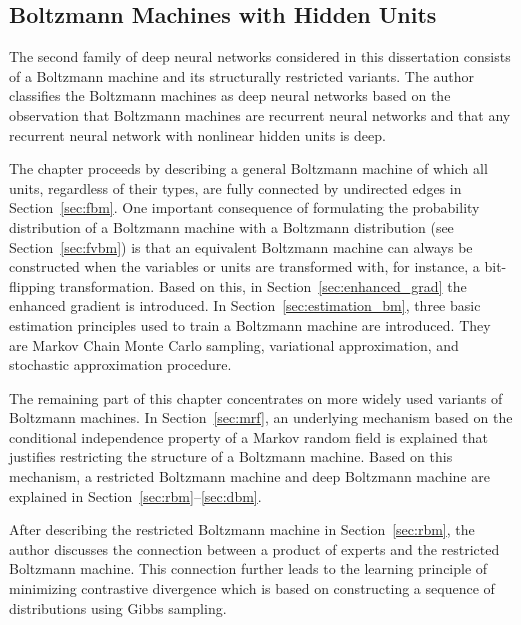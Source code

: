 \documentclass{now}
\newcommand{\alert}[1]{\textcolor{red}{#1}}
\newcommand{\citepub}[1]{\alert{#1}}
\begin{document}
\subsection{Boltzmann Machines with Hidden Units}

The second family of deep neural networks considered in this dissertation
consists of a Boltzmann machine and its structurally restricted variants. The
author classifies the Boltzmann machines as deep neural networks based on the
observation that Boltzmann machines are recurrent neural networks and that any
recurrent neural network with nonlinear hidden units is deep.

The chapter proceeds by describing a general Boltzmann machine of which all
units, regardless of their types, are fully connected by undirected edges in
Section~\ref{sec:fbm}. One important consequence of formulating the probability
distribution of a Boltzmann machine with a Boltzmann distribution (see
Section~\ref{sec:fvbm}) is that an equivalent Boltzmann machine can always be
constructed when the variables or units are transformed with, for instance, a
bit-flipping transformation. Based on this, in Section~\ref{sec:enhanced_grad}
the enhanced gradient 
is introduced.
In Section~\ref{sec:estimation_bm}, three basic estimation principles used to
train a Boltzmann machine are introduced. They are Markov Chain Monte Carlo
sampling, variational approximation, and stochastic approximation procedure. 

The remaining part of this chapter concentrates on more widely used variants of
Boltzmann machines. In Section~\ref{sec:mrf}, an underlying mechanism based on
the conditional independence property of a Markov random field is explained
that justifies restricting the structure of a Boltzmann machine. Based on this
mechanism, a restricted Boltzmann machine and deep Boltzmann machine are
explained in Section~\ref{sec:rbm}--\ref{sec:dbm}.

After describing the restricted Boltzmann machine in Section~\ref{sec:rbm}, the
author discusses the connection between a product of experts and the restricted
Boltzmann machine. This connection further leads to the learning principle of
minimizing contrastive divergence which is based on constructing a sequence of
distributions using Gibbs sampling.
\end{document}
